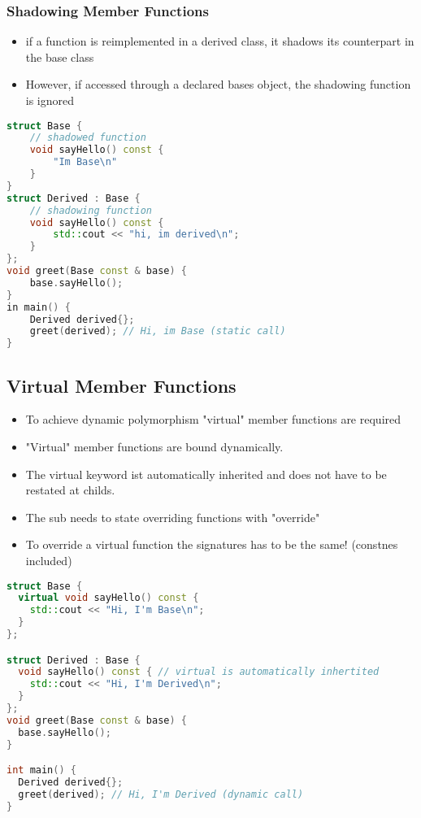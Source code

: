 \subsubsection{Shadowing Member Functions}
\begin{itemize}
  \itemsep -0.5em 
  \item if a function is reimplemented in a derived class, it shadows its counterpart in the base class
  \item However, if accessed through a declared bases object, the shadowing function is ignored
\end{itemize}

\begin{lstlisting}[language=C++]
struct Base {
	// shadowed function 
	void sayHello() const {
		"Im Base\n"
	}
}
struct Derived : Base {
	// shadowing function
	void sayHello() const {
		std::cout << "hi, im derived\n";
	}
};
void greet(Base const & base) {
	base.sayHello(); 
}
in main() {
	Derived derived{};
	greet(derived); // Hi, im Base (static call)
}
\end{lstlisting}

\subsection{Virtual Member Functions}
\begin{itemize}
  \itemsep -0.5em 
  \item To achieve dynamic polymorphism "virtual" member functions are required
  \item "Virtual" member functions are bound dynamically.
  \item The virtual keyword ist automatically inherited and does not have to be restated at childs.
  \item The sub needs to state overriding functions with "override"
  \item To override a virtual function the signatures has to be the same! (constnes included)
\end{itemize}

\begin{lstlisting}[language=C++]
struct Base {
  virtual void sayHello() const {
    std::cout << "Hi, I'm Base\n";
  }
};

struct Derived : Base {
  void sayHello() const { // virtual is automatically inhertited
    std::cout << "Hi, I'm Derived\n";
  }
};
void greet(Base const & base) {
  base.sayHello();
}

int main() {
  Derived derived{};
  greet(derived); // Hi, I'm Derived (dynamic call)
}
\end{lstlisting}

